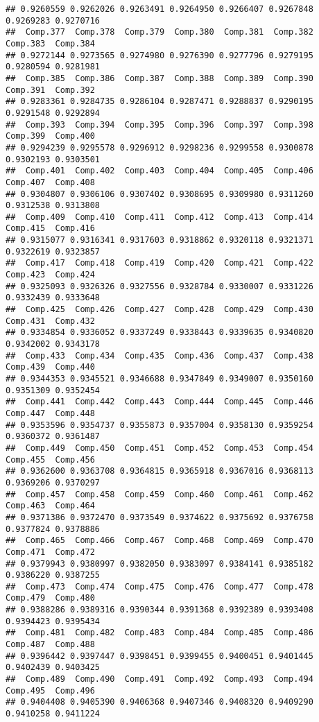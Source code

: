 \documentclass[
]{article}
\begin{document}
\begin{verbatim}
## 0.9260559 0.9262026 0.9263491 0.9264950 0.9266407 0.9267848 0.9269283 0.9270716 
##  Comp.377  Comp.378  Comp.379  Comp.380  Comp.381  Comp.382  Comp.383  Comp.384 
## 0.9272144 0.9273565 0.9274980 0.9276390 0.9277796 0.9279195 0.9280594 0.9281981 
##  Comp.385  Comp.386  Comp.387  Comp.388  Comp.389  Comp.390  Comp.391  Comp.392 
## 0.9283361 0.9284735 0.9286104 0.9287471 0.9288837 0.9290195 0.9291548 0.9292894 
##  Comp.393  Comp.394  Comp.395  Comp.396  Comp.397  Comp.398  Comp.399  Comp.400 
## 0.9294239 0.9295578 0.9296912 0.9298236 0.9299558 0.9300878 0.9302193 0.9303501 
##  Comp.401  Comp.402  Comp.403  Comp.404  Comp.405  Comp.406  Comp.407  Comp.408 
## 0.9304807 0.9306106 0.9307402 0.9308695 0.9309980 0.9311260 0.9312538 0.9313808 
##  Comp.409  Comp.410  Comp.411  Comp.412  Comp.413  Comp.414  Comp.415  Comp.416 
## 0.9315077 0.9316341 0.9317603 0.9318862 0.9320118 0.9321371 0.9322619 0.9323857 
##  Comp.417  Comp.418  Comp.419  Comp.420  Comp.421  Comp.422  Comp.423  Comp.424 
## 0.9325093 0.9326326 0.9327556 0.9328784 0.9330007 0.9331226 0.9332439 0.9333648 
##  Comp.425  Comp.426  Comp.427  Comp.428  Comp.429  Comp.430  Comp.431  Comp.432 
## 0.9334854 0.9336052 0.9337249 0.9338443 0.9339635 0.9340820 0.9342002 0.9343178 
##  Comp.433  Comp.434  Comp.435  Comp.436  Comp.437  Comp.438  Comp.439  Comp.440 
## 0.9344353 0.9345521 0.9346688 0.9347849 0.9349007 0.9350160 0.9351309 0.9352454 
##  Comp.441  Comp.442  Comp.443  Comp.444  Comp.445  Comp.446  Comp.447  Comp.448 
## 0.9353596 0.9354737 0.9355873 0.9357004 0.9358130 0.9359254 0.9360372 0.9361487 
##  Comp.449  Comp.450  Comp.451  Comp.452  Comp.453  Comp.454  Comp.455  Comp.456 
## 0.9362600 0.9363708 0.9364815 0.9365918 0.9367016 0.9368113 0.9369206 0.9370297 
##  Comp.457  Comp.458  Comp.459  Comp.460  Comp.461  Comp.462  Comp.463  Comp.464 
## 0.9371386 0.9372470 0.9373549 0.9374622 0.9375692 0.9376758 0.9377824 0.9378886 
##  Comp.465  Comp.466  Comp.467  Comp.468  Comp.469  Comp.470  Comp.471  Comp.472 
## 0.9379943 0.9380997 0.9382050 0.9383097 0.9384141 0.9385182 0.9386220 0.9387255 
##  Comp.473  Comp.474  Comp.475  Comp.476  Comp.477  Comp.478  Comp.479  Comp.480 
## 0.9388286 0.9389316 0.9390344 0.9391368 0.9392389 0.9393408 0.9394423 0.9395434 
##  Comp.481  Comp.482  Comp.483  Comp.484  Comp.485  Comp.486  Comp.487  Comp.488 
## 0.9396442 0.9397447 0.9398451 0.9399455 0.9400451 0.9401445 0.9402439 0.9403425 
##  Comp.489  Comp.490  Comp.491  Comp.492  Comp.493  Comp.494  Comp.495  Comp.496 
## 0.9404408 0.9405390 0.9406368 0.9407346 0.9408320 0.9409290 0.9410258 0.9411224 

\end{verbatim}
\end{document}
